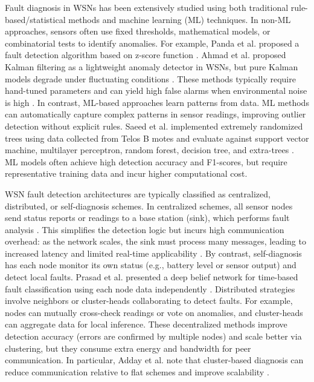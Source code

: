 Fault diagnosis in WSNs has been extensively studied using both traditional rule-based/statistical methods and machine learning (ML) techniques. In non-ML approaches, sensors often use fixed thresholds, mathematical models, or combinatorial tests to identify anomalies. For example, Panda et al. proposed a fault detection algorithm based on z-score function \cite{Panda2014}. Ahmad et al. proposed Kalman filtering as a lightweight anomaly detector in WSNs, but pure Kalman models degrade under fluctuating conditions \cite{Ahmad2024}. These methods typically require hand-tuned parameters and can yield high false alarms when environmental noise is high \cite{Muhammed2017, Zhang2018}. In contrast, ML-based approaches learn patterns from data. ML methods can automatically capture complex patterns in sensor readings, improving outlier detection without explicit rules. Saeed et al. implemented extremely randomized trees using data collected from Telos B motes and evaluate against support vector machine, multilayer perceptron, random forest, decision tree, and extra-trees \cite{Saeed2021}. ML models often achieve high detection accuracy and F1-scores, but require representative training data and incur higher computational cost.

WSN fault detection architectures are typically classified as centralized, distributed, or self-diagnosis schemes. In centralized schemes, all sensor nodes send status reports or readings to a base station (sink), which performs fault analysis \cite{Panda2014}. This simplifies the detection logic but incurs high communication overhead: as the network scales, the sink must process many messages, leading to increased latency and limited real-time applicability \cite{Muhammed2017, Zhang2018}. By contrast, self-diagnosis has each node monitor its own status (e.g., battery level or sensor output) and detect local faults. Prasad et al. presented a deep belief network for time-based fault classification using each node data independently \cite{Prasad2023}. Distributed strategies involve neighbors or cluster-heads collaborating to detect faults. For example, nodes can mutually cross-check readings or vote on anomalies, and cluster-heads can aggregate data for local inference. These decentralized methods improve detection accuracy (errors are confirmed by multiple nodes) and scale better via clustering, but they consume extra energy and bandwidth for peer communication. In particular, Adday et al. note that cluster-based diagnosis can reduce communication relative to flat schemes and improve scalability \cite{Adday2022}. 

